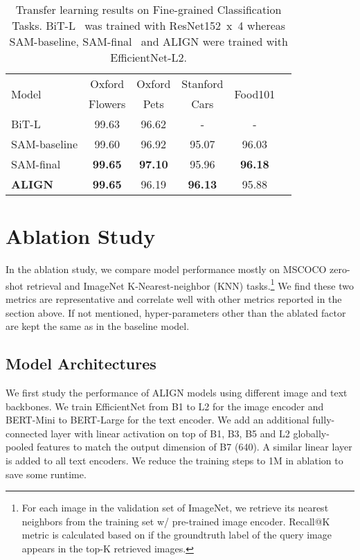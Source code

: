 \documentclass{article}
\begin{document}
\begin{table}[h!]
\vspace{-5mm}
\begin{center}
\caption{Transfer learning results on Fine-grained Classification Tasks. BiT-L~\cite{kolensnikov:bit} was trained with ResNet152~x~4 whereas SAM-baseline, SAM-final~\cite{foret:sam} and ALIGN were trained with EfficientNet-L2.}
\label{tab:small_result}
\vskip 0.05in
\begin{small}
\begin{tabular}{l|ccccc}
\toprule
\multirow{2}{*}{Model} & Oxford  & Oxford & Stanford & \multirow{2}{*}{Food101} \\
& Flowers & Pets & Cars & \\
\midrule
BiT-L& 99.63 & 96.62 & -  & - \\
SAM-baseline
& 99.60 & 96.92 & 95.07 & 96.03 \\
SAM-final
& \textbf{99.65} & \textbf{97.10} & 95.96  & \textbf{96.18} \\
\bf{ALIGN}
& \textbf{99.65} & 96.19 & \textbf{96.13} & 95.88 \\
\bottomrule
\end{tabular}
\end{small}
\end{center}
\vspace{-5mm}
\end{table}

\section{Ablation Study}\label{sec:ablation}

In the ablation study, we compare model performance mostly on MSCOCO zero-shot retrieval and ImageNet K-Nearest-neighbor (KNN) tasks.\footnote{For each image in the validation set of ImageNet, we retrieve its nearest neighbors from the training set w/ pre-trained image encoder. Recall@K metric is calculated based on if the groundtruth label of the query image appears in the top-K retrieved images.} We find these two metrics are representative and correlate well with other metrics reported in the section above. If not mentioned, hyper-parameters other than the ablated factor are kept the same as in the baseline model.

\subsection{Model Architectures}
We first study the performance of ALIGN models using different image and text backbones. We train EfficientNet from B1 to L2 for the image encoder and BERT-Mini to BERT-Large for the text encoder. We add an additional fully-connected layer with linear activation on top of B1, B3, B5 and L2 globally-pooled features to match the output dimension of B7 (640). A similar linear layer is added to all text encoders. We reduce the training steps to 1M in ablation to save some runtime.
\end{document}
